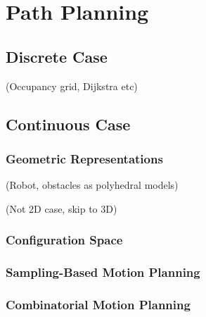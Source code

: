 \section{Path Planning}%
\label{sec:path_planning}

	\subsection{Discrete Case}

		(Occupancy grid, Dijkstra etc)

	\subsection{Continuous Case}

		\subsubsection{Geometric Representations}

			(Robot, obstacles as polyhedral models)

			(Not 2D case, skip to 3D)

		\subsubsection{Configuration Space}

		\subsubsection{Sampling-Based Motion Planning}

		\subsubsection{Combinatorial Motion Planning}

